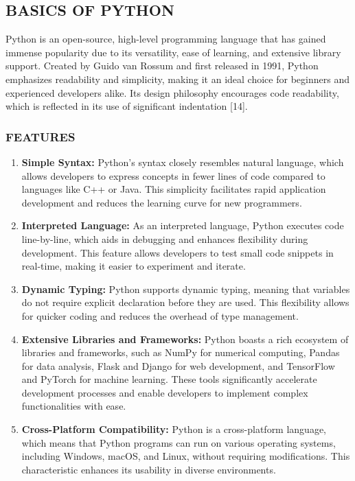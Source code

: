 \documentclass[12pt,a4paper]{article}
\begin{document}
\subsection{BASICS OF PYTHON}
     
     \hspace{2em}Python is an open-source, high-level programming language that has gained immense popularity due to its versatility, ease of learning, and extensive library support. Created by Guido van Rossum and first released in 1991, Python emphasizes readability and simplicity, making it an ideal choice for beginners and experienced developers alike. Its design philosophy encourages code readability, which is reflected in its use of significant indentation [14].

\subsubsection*{FEATURES}
\begin{enumerate}
    \item\textbf{Simple Syntax:} Python’s syntax closely resembles natural language, which allows developers to express concepts in fewer lines of code compared to languages like C++ or Java. This simplicity facilitates rapid application development and reduces the learning curve for new programmers.

\item\textbf{Interpreted Language:} As an interpreted language, Python executes code line-by-line, which aids in debugging and enhances flexibility during development. This feature allows developers to test small code snippets in real-time, making it easier to experiment and iterate.

\item\textbf{Dynamic Typing:} Python supports dynamic typing, meaning that variables do not require explicit declaration before they are used. This flexibility allows for quicker coding and reduces the overhead of type management.

\item\textbf{Extensive Libraries and Frameworks:} Python boasts a rich ecosystem of libraries and frameworks, such as NumPy for numerical computing, Pandas for data analysis, Flask and Django for web development, and TensorFlow and PyTorch for machine learning. These tools significantly accelerate development processes and enable developers to implement complex functionalities with ease.

\item\textbf{Cross-Platform Compatibility:} Python is a cross-platform language, which means that Python programs can run on various operating systems, including Windows, macOS, and Linux, without requiring modifications. This characteristic enhances its usability in diverse environments.
\end{enumerate}
\end{document}
